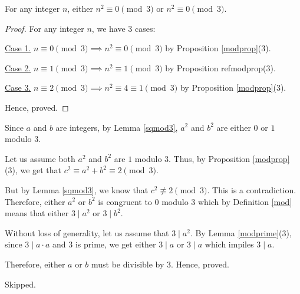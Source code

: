 \begin{solution}
	\begin{lemma} \label{sqmod3}
		For any integer $n$, either $n^2 \equiv 0 \pmod{3}$ or $n^2 \equiv 0 \pmod{3}$.
	\end{lemma}
	\begin{proof} 
		For any integer $n$, we have $3$ cases:

		\underline{Case 1.} $n \equiv 0 \pmod 3 \implies n^2 \equiv 0 \pmod{3}$ by Proposition \ref{modprop}(3).

		\underline{Case 2.} $n \equiv 1 \pmod 3 \implies n^2 \equiv 1 \pmod{3}$ by Proposition ref{modprop}(3).

		\underline{Case 3.} $n \equiv 2 \pmod 3 \implies n^2 \equiv 4 \equiv 1 \pmod{3}$ by Proposition \ref{modprop}(3).

		Hence, proved.
	\end{proof}

	Since $a$ and $b$ are integers, by Lemma \ref{sqmod3}, $a^2$ and $b^2$ are either $0$ or $1$ modulo $3$.

	Let us assume both $a^2$ and $b^2$ are $1$ modulo $3$. Thus, by Proposition \ref{modprop}(3), we get that $c^2 \equiv a^2 + b^2 \equiv 2 \pmod{3}$. 

	But by Lemma \ref{sqmod3}, we know that $c^2 \not\equiv 2 \pmod{3}$. This is a contradiction. Therefore, either $a^2$ or $b^2$ is congruent to $0$ modulo $3$ which by Definition \ref{mod} means that either $3 \mid a^2$ or $3 \mid b^2$.

	Without loss of generality, let us assume that $3 \mid a^2$.
	By Lemma \ref{modprime}(3), since $3 \mid a \cdot a$ and $3$ is prime, we get either $3 \mid a$ or $3 \mid a$ which impiles $3 \mid a$.

	Therefore, either $a$ or $b$ must be divisible by $3$. Hence, proved.
\end{solution}


\begin{problem} Skipped. \end{problem}

